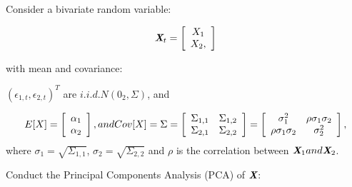 Consider a bivariate random variable:


\begin{equation}
\nonumber
\textbf{\em X}_t=\left[\begin{array}{c} X_{1} \\ X_{2}, \end{array}\right]
\end{equation}

with mean and covariance:

$(\epsilon_{1,t}, \epsilon_{2,t})^T$ are $i.i.d.N(0_2,\Sigma)$, and 

\begin{equation}
\nonumber
E[X] = \left[\begin{array}{c} \alpha_{1} \\  \alpha_{2} \end{array}\right], and \hfill
Cov[X] = \Sigma = \left[\begin{array}{cc} \Sigma_{1,1}  &  \Sigma_{1,2} \\  
                                                                 \Sigma_{2,1}  &  \Sigma_{2,2} \end{array}\right]
                           = \left[\begin{array}{cc} \sigma_{1}^2  &  \rho\sigma_{1}\sigma_{2} \\  
                                                                 \rho\sigma_{1}\sigma_{2}   & \sigma_{2}^2  \end{array}\right],                                      
\end{equation}
where $\sigma_1 = \sqrt{\Sigma_{1,1}}$, $\sigma_2 = \sqrt{\Sigma_{2,2}}$ and $\rho$ is the correlation between $\textbf{\em X}_1 and \textbf{\em X}_2$.

Conduct the Principal Components Analysis (PCA) of $\textbf{\em X}$:



%
%
